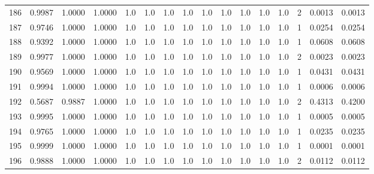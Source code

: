 \begin{tabular}{lrrrrrrrrrrrrrrr}
186 &      0.9987 &  1.0000 &  1.0000 &     1.0 &     1.0 &     1.0 &     1.0 &     1.0 &     1.0 &     1.0 &      1.0 &        1.0 &      2 &                    0.0013 &                     0.0013 \\
187 &      0.9746 &  1.0000 &  1.0000 &     1.0 &     1.0 &     1.0 &     1.0 &     1.0 &     1.0 &     1.0 &      1.0 &        1.0 &      1 &                    0.0254 &                     0.0254 \\
188 &      0.9392 &  1.0000 &  1.0000 &     1.0 &     1.0 &     1.0 &     1.0 &     1.0 &     1.0 &     1.0 &      1.0 &        1.0 &      1 &                    0.0608 &                     0.0608 \\
189 &      0.9977 &  1.0000 &  1.0000 &     1.0 &     1.0 &     1.0 &     1.0 &     1.0 &     1.0 &     1.0 &      1.0 &        1.0 &      2 &                    0.0023 &                     0.0023 \\
190 &      0.9569 &  1.0000 &  1.0000 &     1.0 &     1.0 &     1.0 &     1.0 &     1.0 &     1.0 &     1.0 &      1.0 &        1.0 &      1 &                    0.0431 &                     0.0431 \\
191 &      0.9994 &  1.0000 &  1.0000 &     1.0 &     1.0 &     1.0 &     1.0 &     1.0 &     1.0 &     1.0 &      1.0 &        1.0 &      1 &                    0.0006 &                     0.0006 \\
192 &      0.5687 &  0.9887 &  1.0000 &     1.0 &     1.0 &     1.0 &     1.0 &     1.0 &     1.0 &     1.0 &      1.0 &        1.0 &      2 &                    0.4313 &                     0.4200 \\
193 &      0.9995 &  1.0000 &  1.0000 &     1.0 &     1.0 &     1.0 &     1.0 &     1.0 &     1.0 &     1.0 &      1.0 &        1.0 &      1 &                    0.0005 &                     0.0005 \\
194 &      0.9765 &  1.0000 &  1.0000 &     1.0 &     1.0 &     1.0 &     1.0 &     1.0 &     1.0 &     1.0 &      1.0 &        1.0 &      1 &                    0.0235 &                     0.0235 \\
195 &      0.9999 &  1.0000 &  1.0000 &     1.0 &     1.0 &     1.0 &     1.0 &     1.0 &     1.0 &     1.0 &      1.0 &        1.0 &      1 &                    0.0001 &                     0.0001 \\
196 &      0.9888 &  1.0000 &  1.0000 &     1.0 &     1.0 &     1.0 &     1.0 &     1.0 &     1.0 &     1.0 &      1.0 &        1.0 &      2 &                    0.0112 &                     0.0112 \\

\end{tabular}
